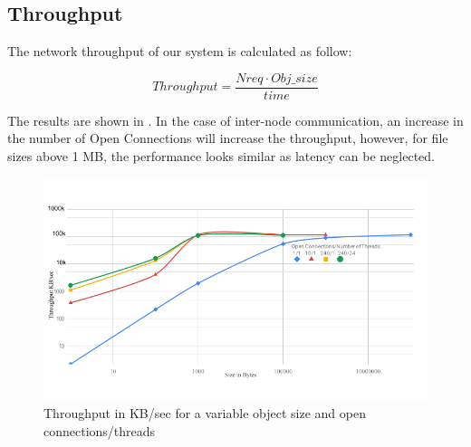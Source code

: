 \documentclass[runningheads]{llncs}
\begin{document}
\subsection{Throughput}
\begin{minipage}{0.5\textwidth}
The network throughput of our system is calculated as follow:
\end{minipage}
\begin{minipage}{0.5\textwidth}
\[Throughput=\frac{Nreq \cdot Obj\_size}{time}\]
\end{minipage}

The results are shown in .
In the case of inter-node communication, an increase in the number of Open Connections will increase the throughput, however, for file sizes above 1 MB, the performance looks similar as latency can be neglected.

\begin{figure}[bt]
\includegraphics[width=1.0\textwidth]{throughput-to-size.png}\vspace{-0.5em}
\caption{Throughput in KB/sec for a variable object size and open connections/threads}
\label{fig:throughput-to-size}
\end{figure}
\end{document}
